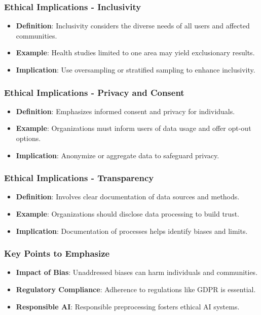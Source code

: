 \documentclass[aspectratio=169]{beamer}
\begin{document}
\begin{frame}[fragile]
    \frametitle{Ethical Implications - Inclusivity}
    \begin{itemize}
        \item \textbf{Definition}: Inclusivity considers the diverse needs of all users and affected communities.
        \item \textbf{Example}: Health studies limited to one area may yield exclusionary results.
        \item \textbf{Implication}: Use oversampling or stratified sampling to enhance inclusivity.
    \end{itemize}
\end{frame}

\begin{frame}[fragile]
    \frametitle{Ethical Implications - Privacy and Consent}
    \begin{itemize}
        \item \textbf{Definition}: Emphasizes informed consent and privacy for individuals.
        \item \textbf{Example}: Organizations must inform users of data usage and offer opt-out options.
        \item \textbf{Implication}: Anonymize or aggregate data to safeguard privacy.
    \end{itemize}
\end{frame}

\begin{frame}[fragile]
    \frametitle{Ethical Implications - Transparency}
    \begin{itemize}
        \item \textbf{Definition}: Involves clear documentation of data sources and methods.
        \item \textbf{Example}: Organizations should disclose data processing to build trust.
        \item \textbf{Implication}: Documentation of processes helps identify biases and limits.
    \end{itemize}
\end{frame}

\begin{frame}[fragile]
    \frametitle{Key Points to Emphasize}
    \begin{itemize}
        \item \textbf{Impact of Bias}: Unaddressed biases can harm individuals and communities.
        \item \textbf{Regulatory Compliance}: Adherence to regulations like GDPR is essential.
        \item \textbf{Responsible AI}: Responsible preprocessing fosters ethical AI systems.
    \end{itemize}
\end{frame}
\end{document}
